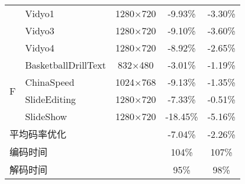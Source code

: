 \begin{table}[!p]
\begin{tabular}{@{}clccc@{}}
                                         & Vidyo1                                    & 1280$\times$720         & -9.93\%                            & -3.30\%                       \\
                                         & Vidyo3                                    & 1280$\times$720         & -9.10\%                            & -3.60\%                       \\
                                         & Vidyo4                                    & 1280$\times$720         & -8.92\%                            & -2.65\%                       \\
        \multirow{4}{*}{F}               & BasketballDrillText                       & 832$\times$480          & -3.01\%                            & -1.19\%                       \\
                                         & ChinaSpeed                                & 1024$\times$768         & -9.13\%                            & -1.35\%                       \\
                                         & SlideEditing                              & 1280$\times$720         & -7.33\%                            & -0.51\%                       \\
                                         & SlideShow                                 & 1280$\times$720         & -18.45\%                           & -5.16\%                       \\ \midrule
        \multicolumn{2}{l}{平均码率优化} &                                           & -7.04\%                 & -2.26\%                                                            \\ \midrule
        \multicolumn{2}{l}{编码时间}     &                                           & 104\%                   & 107\%                                                              \\ \midrule
        \multicolumn{2}{l}{解码时间}     &                                           & 95\%                    & 98\%                                                               \\ \bottomrule
    \end{tabular}
\end{table}

